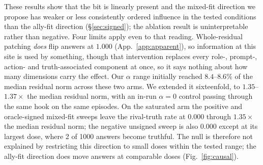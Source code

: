\documentclass{article}
\begin{document}
These results show that the bit is linearly present and the mixed-fit direction we propose
has weaker or less consistently ordered influence in the tested conditions than the ally-fit direction
(\S\ref{sec:signed}); the ablation result is uninterpretable rather than negative. Four limits apply
even to that reading. Whole-residual patching \emph{does} flip answers at $1.000$ (App.~\ref{app:apparent}), so information
at this site is used by something, though that intervention replaces every role-, prompt-, action- and
truth-associated component at once, so it says nothing about how many dimensions carry the effect. Our
$\alpha$ range initially reached $8.4$--$8.6\%$ of the median residual norm across these two arms. We extended it sixteenfold,
to $1.35$--$1.37\times$ the median residual norm, with an in-run $\alpha{=}0$ control passing through the same hook
on the same episodes. On the saturated arm the positive and oracle-signed mixed-fit sweeps leave the rival-truth rate at $0.000$ through $1.35\times$ the median residual norm; the negative unsigned sweep is also $0.000$ except at its largest dose, where 2 of 1000 answers become truthful. The null is therefore not explained by restricting this direction to small doses within the tested range; the ally-fit direction does move answers at comparable doses (Fig.~\ref{fig:causal}).
\end{document}
